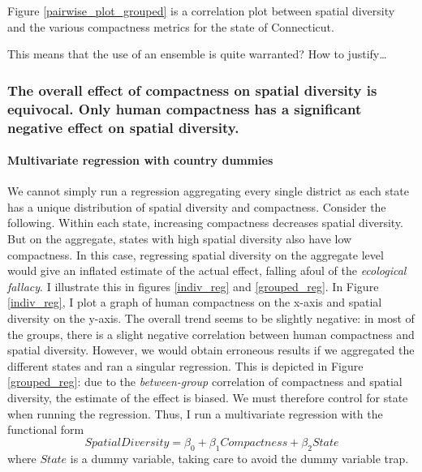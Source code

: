 \documentclass[]{article}
\let\oldparagraph\paragraph
\renewcommand{\paragraph}[1]{\oldparagraph{#1}\mbox{}}
\begin{document}
Figure \ref{pairwise_plot_grouped} is a correlation plot between spatial
diversity and the various compactness metrics for the state of
Connecticut.

This means that the use of an ensemble is quite warranted? How to
justify\ldots{}

\hypertarget{the-overall-effect-of-compactness-on-spatial-diversity-is-equivocal.-only-human-compactness-has-a-significant-negative-effect-on-spatial-diversity.}{%
\subsubsection{The overall effect of compactness on spatial diversity is
equivocal. Only human compactness has a significant negative effect on
spatial
diversity.}\label{the-overall-effect-of-compactness-on-spatial-diversity-is-equivocal.-only-human-compactness-has-a-significant-negative-effect-on-spatial-diversity.}}

\hypertarget{multivariate-regression-with-country-dummies}{%
\paragraph{Multivariate regression with country
dummies}\label{multivariate-regression-with-country-dummies}}

We cannot simply run a regression aggregating every single district as
each state has a unique distribution of spatial diversity and
compactness. Consider the following. Within each state, increasing
compactness decreases spatial diversity. But on the aggregate, states
with high spatial diversity also have low compactness. In this case,
regressing spatial diversity on the aggregate level would give an
inflated estimate of the actual effect, falling afoul of the
\emph{ecological fallacy}. I illustrate this in figures \ref{indiv_reg}
and \ref{grouped_reg}. In Figure \ref{indiv_reg}, I plot a graph of
human compactness on the x-axis and spatial diversity on the y-axis. The
overall trend seems to be slightly negative: in most of the groups,
there is a slight negative correlation between human compactness and
spatial diversity. However, we would obtain erroneous results if we
aggregated the different states and ran a singular regression. This is
depicted in Figure \ref{grouped_reg}: due to the \emph{between-group}
correlation of compactness and spatial diversity, the estimate of the
effect is biased. We must therefore control for state when running the
regression. Thus, I run a multivariate regression with the functional
form \[SpatialDiversity = \beta_0 + \beta_1
Compactness + \beta_2 State\] where \(State\) is a dummy variable,
taking care to avoid the dummy variable trap.
\end{document}
